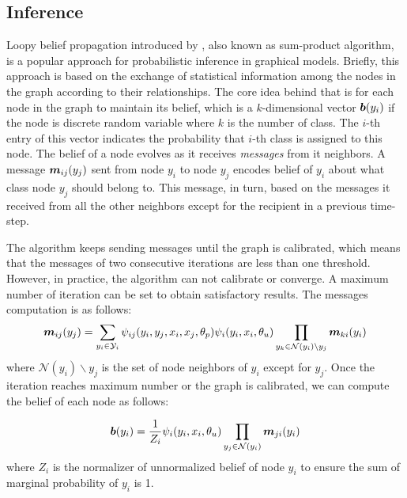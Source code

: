 \subsection{Inference}
Loopy belief propagation introduced by \cite{pearl2014probabilistic}, also known as sum-product algorithm, is a popular approach for probabilistic inference in graphical models. Briefly, this approach is based on the exchange of statistical information among the nodes in the graph according to their relationships. The core idea behind that is for each node in the graph to maintain its belief, which is a $k$-dimensional vector $\boldsymbol b(y_i)$ if the node is discrete random variable where $k$ is the number of class. The $i$-th entry of this vector indicates the probability that $i$-th class is assigned to this node. The belief of a node evolves as it receives \textit{messages} from it neighbors. A message $\boldsymbol m_{ij}(y_j)$ sent from node $y_i$ to node $y_j$ encodes belief of $y_i$ about what class node $y_j$ should belong to. This message, in turn, based on the messages it received from all the other neighbors except for the recipient in a previous time-step.

The algorithm keeps sending messages until the graph is calibrated, which means that the messages of two consecutive iterations are less than one threshold. However, in practice, the algorithm can not calibrate or converge. A maximum number of iteration can be set to obtain satisfactory results. The messages computation is as follows:
\begin{equation}
\label{message}
\boldsymbol m_{ij}(y_j) = \sum_{y_i\in \mathcal{Y}_i}\psi_{ij}(y_i, y_j, x_i, x_j, \theta_p)\psi_i(y_i, x_i, \theta_u) \prod_{y_k\in\mathcal{N}(y_i)\backslash y_j}\boldsymbol m_{ki}(y_i)
\end{equation}
where $\mathcal{N}(y_i) \backslash y_j$ is the set of node neighbors of $y_i$ except for $y_j$. Once the iteration reaches maximum number or the graph is calibrated, we can compute the belief of each node as follows:

\begin{equation}
\label{belief}
\boldsymbol b(y_i) = \frac{1}{Z_i}\psi_i(y_i, x_i, \theta_u) \prod_{y_j\in\mathcal{N}(y_i)}\boldsymbol m_{ji}(y_i)
\end{equation}
where $Z_i$ is the normalizer of unnormalized belief of node $y_i$ to ensure the sum of marginal probability of $y_i$ is 1. 


